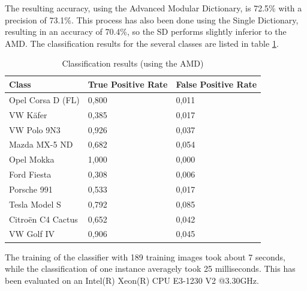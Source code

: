The resulting accuracy, using the Advanced Modular Dictionary, is 72.5\% with a precision of 73.1\%. This process has also been done using the Single Dictionary, resulting in an accuracy of 70.4\%, so the SD performs slightly inferior to the AMD. The classification results for the several classes are listed in table \ref{table:classificationResults}.
\begin{table}[btph]
    \centering
    \begin{tabular}{ | l | l | l |}
    \hline
    \textbf{Class} & \textbf{True Positive Rate} & \textbf{False Positive Rate} \\ \hline
    Opel Corsa D (FL)  & 0,800 &  0,011 \\ \hline
    VW K\"afer & 	0,385 &  0,017 \\ \hline
    VW Polo 9N3  & 	0,926 &  0,037 \\ \hline
    Mazda MX-5 ND  & 0,682 &  0,054 \\ \hline
    Opel Mokka & 	1,000 &  0,000 \\ \hline
    Ford Fiesta  & 	0,308 &  0,006 \\ \hline
    Porsche 991  & 	0,533 &  0,017 \\ \hline
    Tesla Model S  & 0,792 &  0,085 \\ \hline
    Citro\"en C4 Cactus & 	0,652 &  0,042 \\ \hline
    VW Golf IV  & 	0,906 &  0,045 \\ \hline
    \end{tabular}
    \caption{Classification results (using the AMD)}
    \label{table:classificationResults}
\end{table}
The training of the classifier with 189 training images took about 7 seconds, while the classification of one instance averagely took 25 milliseconds. This has been evaluated on an Intel(R) Xeon(R) CPU E3-1230 V2 @3.30GHz.

